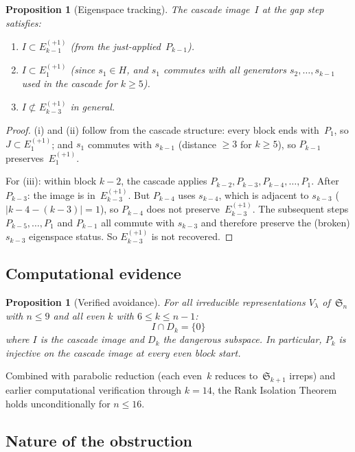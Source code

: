 \documentclass[11pt]{article}
\newtheorem{proposition}[theorem]{Proposition}
\theoremstyle{definition}
\theoremstyle{remark}
\newcommand{\Sym}{\mathfrak{S}}
\newcommand{\Eplus}[1]{E_{#1}^{(+1)}}
\begin{document}
\begin{proposition}[Eigenspace tracking]
\label{prop:eigenspace}
The cascade image~$I$ at the gap step satisfies:
\begin{enumerate}
  \item[\rm(i)] $I \subset \Eplus{k-1}$ (from the just-applied~$P_{k-1}$).
  \item[\rm(ii)] $I \subset \Eplus{1}$ (since $s_1 \in H$, and $s_1$
    commutes with all generators $s_2, \ldots, s_{k-1}$ used in the
    cascade for $k \ge 5$).
  \item[\rm(iii)] $I \not\subset \Eplus{k-3}$ in general.
\end{enumerate}
\end{proposition}

\begin{proof}
(i) and (ii) follow from the cascade structure: every block ends
with~$P_1$, so $J \subset \Eplus{1}$; and $s_1$ commutes with $s_{k-1}$
(distance $\ge 3$ for $k \ge 5$), so $P_{k-1}$ preserves~$\Eplus{1}$.

For (iii): within block $k{-}2$, the cascade applies $P_{k-2}, P_{k-3},
P_{k-4}, \ldots, P_1$. After $P_{k-3}$: the image is
in~$\Eplus{k-3}$. But $P_{k-4}$ uses $s_{k-4}$, which is adjacent
to $s_{k-3}$ ($|k{-}4 - (k{-}3)| = 1$), so $P_{k-4}$ does not
preserve~$\Eplus{k-3}$. The subsequent steps $P_{k-5}, \ldots, P_1$
and $P_{k-1}$ all commute with $s_{k-3}$ and therefore preserve the
(broken) $s_{k-3}$ eigenspace status. So $\Eplus{k-3}$ is not
recovered.
\end{proof}

\subsection{Computational evidence}

\begin{proposition}[Verified avoidance]
For all irreducible representations $V_\lambda$ of\/~$\Sym_n$ with
$n \le 9$ and all even $k$ with $6 \le k \le n{-}1$:
\[
  I \cap D_k = \{0\}
\]
where $I$ is the cascade image and $D_k$ the dangerous subspace.
In particular, $P_k$ is injective on the cascade image at every even
block start.
\end{proposition}

Combined with parabolic reduction (each even~$k$ reduces to~$\Sym_{k+1}$
irreps) and earlier computational verification through $k = 14$, the
Rank Isolation Theorem holds unconditionally for $n \le 16$.

\subsection{Nature of the obstruction}
\end{document}
